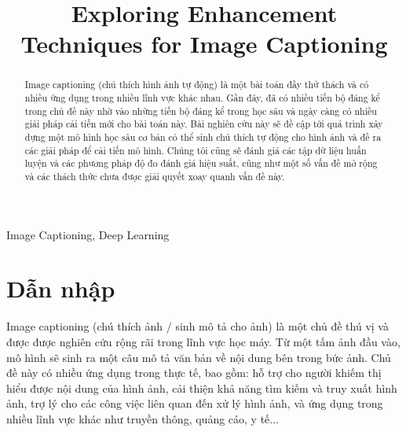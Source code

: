 \documentclass[conference]{IEEEtran}
\begin{document}
\title{Exploring Enhancement Techniques for Image Captioning\\}
\author{
\and
{}
}

\maketitle

\begin{abstract}
Image captioning (chú thích hình ảnh tự động) là một bài toán đầy thử thách và có nhiều ứng dụng trong nhiều lĩnh vực khác nhau.
Gần đây, đã có nhiều tiến bộ đáng kể trong chủ đề này nhờ vào những tiến bộ đáng kể trong học sâu và ngày càng có nhiều giải pháp cải tiến mới cho bài toán này.
Bài nghiên cứu này sẽ đề cập tới quá trình xây dựng một mô hình học sâu cơ bản có thể sinh chú thích tự động cho hình ảnh và đề ra các giải pháp để cải tiến mô hình.
Chúng tôi cũng sẽ đánh giá các tập dữ liệu huấn luyện và các phương pháp độ đo đánh giá hiệu suất, cũng như một số vấn đề mở rộng và các thách thức chưa được giải quyết xoay quanh vấn đề này.
\end{abstract} 

\begin{IEEEkeywords}
Image Captioning, Deep Learning
\end{IEEEkeywords}

\section{Dẫn nhập}
Image captioning (chú thích ảnh / sinh mô tả cho ảnh) là một chủ đề thú vị và được được nghiên cứu rộng rãi trong lĩnh vực học máy.
Từ một tấm ảnh đầu vào, mô hình sẽ sinh ra một câu mô tả văn bản về nội dung bên trong bức ảnh.
Chủ đề này có nhiều ứng dụng trong thực tế, bao gồm: hỗ trợ cho người khiếm thị hiểu được nội dung của hình ảnh, cải thiện khả năng tìm kiếm và truy xuất hình ảnh, trợ lý cho các công việc liên quan đến xử lý hình ảnh, và ứng dụng trong nhiều lĩnh vực khác như truyền thông, quảng cáo, y tế... 
\end{document}
